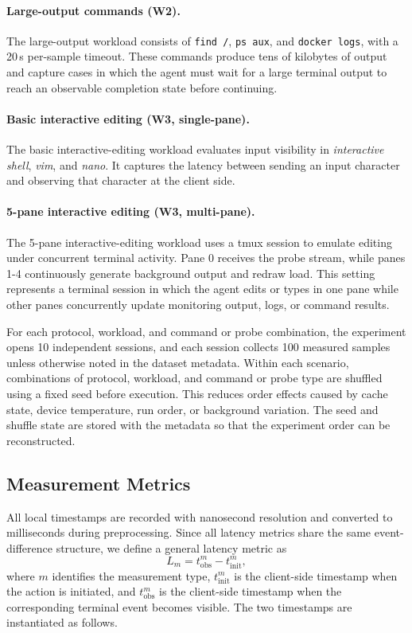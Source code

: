 \paragraph{Large-output commands (W2).}
The large-output workload consists of \texttt{find~/}, \texttt{ps~aux}, and \texttt{docker~logs}, with a 20\,s per-sample timeout. These commands produce tens of kilobytes of output and capture cases in which the agent must wait for a large terminal output to reach an observable completion state before continuing.

\paragraph{Basic interactive editing (W3, single-pane).}
The basic interactive-editing workload evaluates input visibility in \textit{interactive shell}, \textit{vim}, and \textit{nano}. It captures the latency between sending an input character and observing that character at the client side.

\paragraph{5-pane interactive editing (W3, multi-pane).}
The 5-pane interactive-editing workload uses a tmux session to emulate editing under concurrent terminal activity. Pane 0 receives the probe stream, while panes 1-4 continuously generate background output and redraw load. This setting represents a terminal session in which the agent edits or types in one pane while other panes concurrently update monitoring output, logs, or command results.

For each protocol, workload, and command or probe combination, the experiment opens 10 independent sessions, and each session collects 100 measured samples unless otherwise noted in the dataset metadata. Within each scenario, combinations of protocol, workload, and command or probe type are shuffled using a fixed seed before execution. This reduces order effects caused by cache state, device temperature, run order, or background variation. The seed and shuffle state are stored with the metadata so that the experiment order can be reconstructed.

\subsection{Measurement Metrics}
\label{subsec:measurement-metrics}

All local timestamps are recorded with nanosecond resolution and converted to milliseconds during preprocessing. Since all latency metrics share the same event-difference structure, we define a general latency metric as
\begin{equation}
L_m = t_{\mathrm{obs}}^{m} - t_{\mathrm{init}}^{m},
\end{equation}
where $m$ identifies the measurement type, $t_{\mathrm{init}}^{m}$ is the 
client-side timestamp when the action is initiated, and $t_{\mathrm{obs}}^{m}$ is the client-side timestamp when the corresponding terminal event becomes visible. The two timestamps are instantiated as follows.

